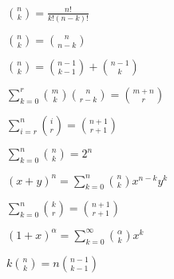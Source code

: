 $\binom{n}{k} = \frac{n!}{k!(n-k)!}$

$\binom{n}{k} = \binom{n}{n-k}$

$\binom{n}{k} = \binom{n-1}{k-1} + \binom{n-1}{k}$

$\sum_{k=0}^{r} \binom{m}{k}\binom{n}{r-k} = \binom{m+n}{r}$

$\sum_{i=r}^{n} \binom{i}{r} = \binom{n+1}{r+1}$

$\sum_{k=0}^{n} \binom{n}{k} = 2^n$

$(x+y)^n = \sum_{k=0}^{n} \binom{n}{k} x^{n-k} y^k$

$\sum_{k=0}^{n} \binom{k}{r} = \binom{n+1}{r+1}$

$(1+x)^\alpha = \sum_{k=0}^{\infty} \binom{\alpha}{k} x^k$

$k\binom{n}{k} = n\binom{n-1}{k-1}$
